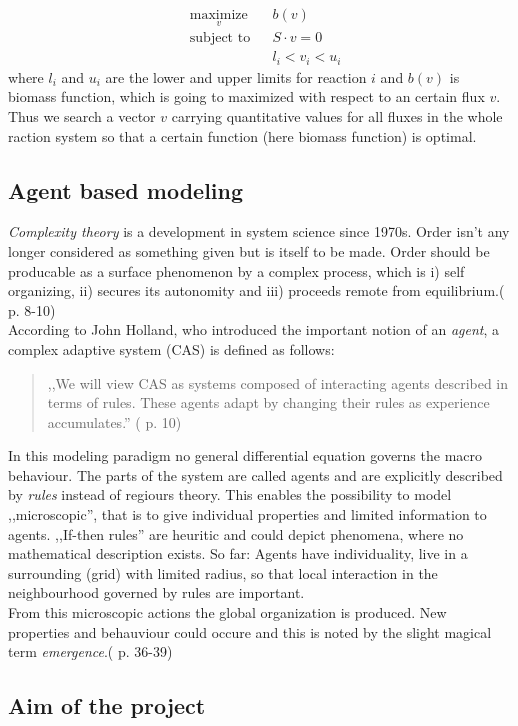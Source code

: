 \begin{equation*}
  \begin{aligned}
    & \underset{v}{\text{maximize}} & & b(v) \\
    & \text{subject to} & & S \cdot v = 0 \\
    & & & l_i < v_i < u_i
  \end{aligned}
\end{equation*}
where $l_i$ and $u_i$ are the lower and upper limits for reaction $i$ and $b(v)$ is biomass function, which is going to maximized with respect to an certain flux $v$.
Thus we search a vector $v$ carrying quantitative values for all fluxes in the whole raction system so that a certain function (here biomass function) is optimal.


\subsection{Agent based modeling}
\textit{Complexity theory} is a development in system science since 1970s.
Order isn't any longer considered as something given but is itself to be made.
Order should be producable as a surface phenomenon by a complex process, which is i) self organizing, ii) secures its autonomity and iii) proceeds remote from equilibrium.(\cite{Cilliers2007} p. 8-10)\\
According to John Holland, who introduced the important notion of an \textit{agent}, a complex adaptive system (CAS) is defined as follows:
\begin{quote}
,,We will view CAS as systems composed of interacting agents described in terms of rules. These agents adapt by changing their rules as experience accumulates.'' (\cite{Holland1995} p. 10)
\end{quote}
In this modeling paradigm no general differential equation governs the macro behaviour.
The parts of the system are called agents and are explicitly described by \textit{rules} instead of regiours theory.
This enables the possibility to model ,,microscopic'', that is to give individual properties and limited information to agents.
,,If-then rules'' are heuritic and could depict phenomena, where no mathematical description exists.
So far: Agents have individuality, live in a surrounding (grid) with limited radius, so that local interaction in the neighbourhood governed by rules are important.\\
From this microscopic actions the global organization is produced.
New properties and behauviour could occure and this is noted by the slight magical term \textit{emergence}.(\cite{Zimmermann2010} p. 36-39)


\subsection{Aim of the project}

